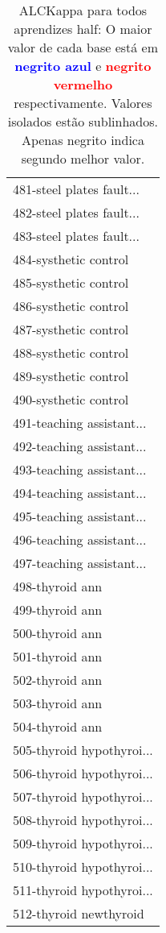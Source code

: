 \begin{table}[h]
\caption{ALCKappa para todos aprendizes half: O maior valor de cada base está em \textcolor{blue}{\textbf{negrito azul}} e \textcolor{red}{\textbf{negrito vermelho}} respectivamente. Valores isolados estão sublinhados. Apenas negrito indica segundo melhor valor.}
\begin{center}\begin{tabular}{l}
 & \\ \hline 481-steel plates fault... &  \\
482-steel plates fault... &  \\
483-steel plates fault... &  \\
484-systhetic control &  \\
485-systhetic control &  \\
486-systhetic control &  \\
487-systhetic control &  \\ \hline
488-systhetic control &  \\
489-systhetic control &  \\
490-systhetic control &  \\
491-teaching assistant... &  \\
492-teaching assistant... &  \\
493-teaching assistant... &  \\
494-teaching assistant... &  \\ \hline
495-teaching assistant... &  \\
496-teaching assistant... &  \\
497-teaching assistant... &  \\
498-thyroid ann &  \\
499-thyroid ann &  \\
500-thyroid ann &  \\
501-thyroid ann &  \\ \hline
502-thyroid ann &  \\
503-thyroid ann &  \\
504-thyroid ann &  \\
505-thyroid hypothyroi... &  \\
506-thyroid hypothyroi... &  \\
507-thyroid hypothyroi... &  \\
508-thyroid hypothyroi... &  \\ \hline
509-thyroid hypothyroi... &  \\
510-thyroid hypothyroi... &  \\
511-thyroid hypothyroi... &  \\
512-thyroid newthyroid &  \\\end{tabular}\label{stratsALCKappa15AllReduxb}
\end{center}
\end{table}
